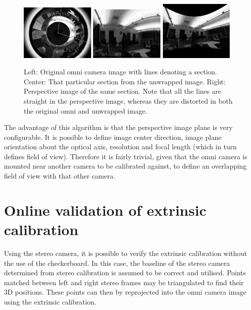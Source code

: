 \begin{figure}[b!]
  \centering
    \includegraphics[width=0.32\textwidth]{chapters/images/omni_raw_office}
    \includegraphics[width=0.32\textwidth]{chapters/images/unwrapped_office}
    \includegraphics[width=0.32\textwidth]{chapters/images/perspective_office}
  \caption{Left: Original omni camera image with lines denoting a section.  Center: That particular section from the unwrapped image.  Right: Perspective image of the same section.  Note that all the lines are straight in the perspective image, whereas they are distorted in both the original omni and unwrapped image.}
  \label{fig:omni_images}
\end{figure}

The advantage of this algorithm is that the perspective image plane is very configurable.  It is possible to define image center direction, image plane orientation about the optical axis, resolution and focal length (which in turn defines field of view).  Therefore it is fairly trivial, given that the omni camera is mounted near another camera to be calibrated against, to define an overlapping field of view with that other camera. %


\section{Online validation of extrinsic calibration}
\label{sec:verification_tool}

Using the stereo camera, it is possible to verify the extrinsic calibration without the use of the checkerboard.  In this case, the baseline of the stereo camera determined from stereo calibration is assumed to be correct and utilised.  Points matched between left and right stereo frames may be triangulated to find their 3D positions.  These points can then by reprojected into the omni camera image using the extrinsic calibration.

